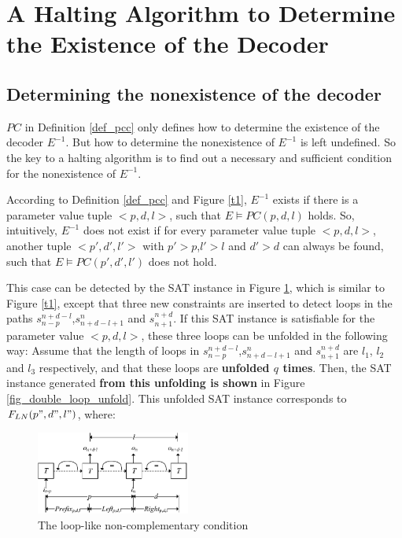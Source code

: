 \documentclass[journal]{IEEEtran}
\begin{document}
\section{A Halting Algorithm to Determine the Existence of the Decoder}\label{sec_exist}
\subsection{Determining the nonexistence of the decoder}\label{subsec_deterNo}

$PC$ in Definition \ref{def_pcc} only defines how to determine the existence of the decoder $E^{-1}$.
But how to determine the nonexistence of $E^{-1}$ is left undefined.
So the key to a halting algorithm is to find out a necessary and sufficient condition for the nonexistence of $E^{-1}$.

According to Definition \ref{def_pcc} and Figure \ref{t1},
$E^{-1}$ exists if there is a parameter value tuple $<p,d,l>$,
such that $E\vDash PC(p,d,l)$ holds.
So,
intuitively,
$E^{-1}$ does not exist if for every parameter value tuple $<p,d,l>$,
another tuple $<p',d',l'>$ with $p'>p$,$l'>l$ and $d'>d$ can always be found,
such that $E\vDash PC(p',d',l')$ does not hold.

This case can be detected by the SAT instance in Figure \ref{fig_double_loop},
which is similar to Figure \ref{t1},
except that three new constraints are inserted to detect loops in the paths $s_{n-p}^{n+d-l}$,$s_{n+d-l+1}^n$ and $s_{n+1}^{n+d}$.
If this SAT instance is satisfiable for the parameter value $<p,d,l>$,
these three loops can be unfolded in the following way:
Assume that the length of loops in $s_{n-p}^{n+d-l}$,$s_{n+d-l+1}^n$ and $s_{n+1}^{n+d}$ are $l_1$, $l_2$ and $l_3$ respectively,
and that these loops are \textbf{unfolded $q$ times}.
Then,
the SAT instance generated \textbf{from this unfolding is shown} in Figure \ref{fig_double_loop_unfold}.
This unfolded SAT instance corresponds to $F_{LN}(p",d",l")$,
where:

\begin{figure}[t]
\begin{center}
\includegraphics[width=0.45\textwidth]{doubleloop}
\end{center}
\caption{The loop-like non-complementary condition}
  \label{fig_double_loop}
\end{figure}
\end{document}
